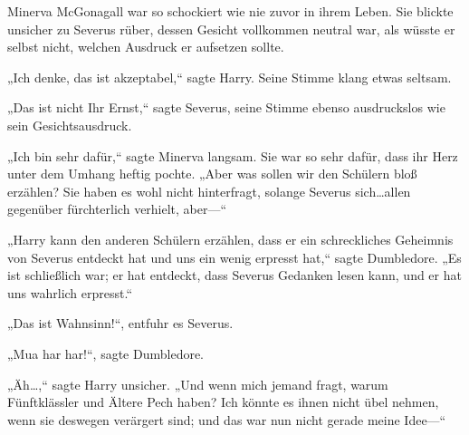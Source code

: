 Minerva McGonagall war so schockiert wie nie zuvor in ihrem Leben. Sie blickte unsicher zu Severus rüber, dessen Gesicht vollkommen neutral war, als wüsste er selbst nicht, welchen Ausdruck er aufsetzen sollte.

„Ich denke, das ist akzeptabel,“ sagte Harry. Seine Stimme klang etwas seltsam.

„Das ist nicht Ihr Ernst,“ sagte Severus, seine Stimme ebenso ausdruckslos wie sein Gesichtsausdruck.

„Ich bin sehr dafür,“ sagte Minerva langsam. Sie war so sehr dafür, dass ihr Herz unter dem Umhang heftig pochte. „Aber was sollen wir den Schülern bloß erzählen? Sie haben es wohl nicht hinterfragt, solange Severus sich…allen gegenüber fürchterlich verhielt, aber—“

„Harry kann den anderen Schülern erzählen, dass er ein schreckliches Geheimnis von Severus entdeckt hat und uns ein wenig erpresst hat,“ sagte Dumbledore. „Es ist schließlich war; er hat entdeckt, dass Severus Gedanken lesen kann, und er hat uns wahrlich erpresst.“

„Das ist Wahnsinn!“, entfuhr es Severus.

„Mua har har!“, sagte Dumbledore.

„Äh…,“ sagte Harry unsicher. „Und wenn mich jemand fragt, warum Fünftklässler und Ältere Pech haben? Ich könnte es ihnen nicht übel nehmen, wenn sie deswegen verärgert sind; und das war nun nicht gerade meine Idee—“

